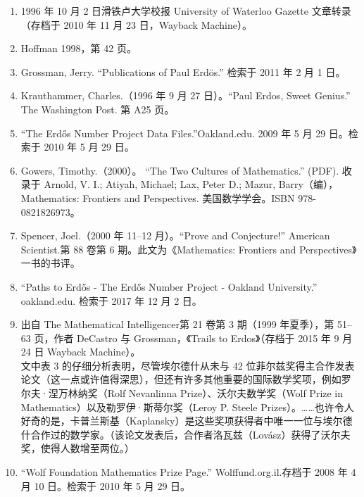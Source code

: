 \begin{enumerate}
\item 1996 年 10 月 2 日滑铁卢大学校报 University of Waterloo Gazette 文章转录（存档于 2010 年 11 月 23 日，Wayback Machine）。
\item Hoffman 1998，第 42 页。
\item Grossman, Jerry. “Publications of Paul Erdös.” 检索于 2011 年 2 月 1 日。
\item Krauthammer, Charles.（1996 年 9 月 27 日）。“Paul Erdos, Sweet Genius.” The Washington Post. 第 A25 页。
\item “The Erdős Number Project Data Files.”Oakland.edu. 2009 年 5 月 29 日。检索于 2010 年 5 月 29 日。
\item Gowers, Timothy.（2000）。 “The Two Cultures of Mathematics.” (PDF). 收录于 Arnold, V. I.; Atiyah, Michael; Lax, Peter D.; Mazur, Barry（编），Mathematics: Frontiers and Perspectives. 美国数学学会。ISBN 978-0821826973。
\item Spencer, Joel.（2000 年 11–12 月）。“Prove and Conjecture!” American Scientist.第 88 卷第 6 期。此文为《Mathematics: Frontiers and Perspectives》一书的书评。
\item  “Paths to Erdős - The Erdős Number Project - Oakland University.” oakland.edu. 检索于 2017 年 12 月 2 日。
\item 出自 The Mathematical Intelligencer第 21 卷第 3 期（1999 年夏季），第 51–63 页，作者 DeCastro 与 Grossman，《Trails to Erdos》（存档于 2015 年 9 月 24 日 Wayback Machine）。\\
文中表 3 的仔细分析表明，尽管埃尔德什从未与 42 位菲尔兹奖得主合作发表论文（这一点或许值得深思），但还有许多其他重要的国际数学奖项，例如罗尔夫·涅万林纳奖（Rolf Nevanlinna Prize）、沃尔夫数学奖（Wolf Prize in Mathematics）以及勒罗伊·斯蒂尔奖（Leroy P. Steele Prizes）。……也许令人好奇的是，卡普兰斯基（Kaplansky）是这些奖项获得者中唯一一位与埃尔德什合作过的数学家。（该论文发表后，合作者洛瓦兹（Lovász）获得了沃尔夫奖，使得人数增至两位。）
\item “Wolf Foundation Mathematics Prize Page.” Wolffund.org.il.存档于 2008 年 4 月 10 日。检索于 2010 年 5 月 29 日。
\end{enumerate}